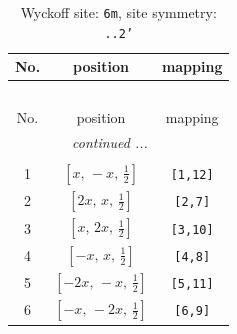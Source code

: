 \documentclass[fleqn,8pt]{jsarticle}
\begin{document}
\renewcommand{\arraystretch}{1.2}
\begin{longtable}{ccc}
\caption{Wyckoff site: {\tt 6m}, site symmetry: {\tt ..2'}}
 \\
 \hline \hline
No. & position & mapping \\ \hline \endfirsthead

\multicolumn{2}{l}{\tablename\ \thetable{}} \\
 \hline \hline
No. & position & mapping \\ \hline \endhead

 \hline \hline
\multicolumn{2}{r}{\footnotesize\it continued ...} \\ \endfoot

 \hline \hline
\multicolumn{2}{r}{} \\ \endlastfoot

1 & $\left[ x,\, - x,\, \frac{1}{2} \right]$ & {\tt [1,12]} \\ \hline
2 & $\left[ 2 x,\, x,\, \frac{1}{2} \right]$ & {\tt [2,7]} \\ \hline
3 & $\left[ x,\, 2 x,\, \frac{1}{2} \right]$ & {\tt [3,10]} \\ \hline
4 & $\left[ - x,\, x,\, \frac{1}{2} \right]$ & {\tt [4,8]} \\ \hline
5 & $\left[ - 2 x,\, - x,\, \frac{1}{2} \right]$ & {\tt [5,11]} \\ \hline
6 & $\left[ - x,\, - 2 x,\, \frac{1}{2} \right]$ & {\tt [6,9]} \\
\end{longtable}
\renewcommand{\arraystretch}{1.2}
\end{document}
